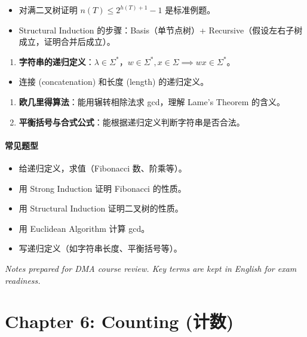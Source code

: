 \documentclass[10pt,a4paper,openany]{ctexbook}
\theoremstyle{definition}
\theoremstyle{remark}
\begin{document}
\begin{itemize}
\item 对满二叉树证明 $n(T) \le 2^{h(T)+1} - 1$ 是标准例题。
\item Structural Induction 的步骤：Basis（单节点树）+ Recursive（假设左右子树成立，证明合并后成立）。

\end{itemize}

\begin{enumerate}
\item \textbf{字符串的递归定义}：$\lambda \in \Sigma^*$，$w \in \Sigma^*, x \in \Sigma \implies wx \in \Sigma^*$。
\end{enumerate}

\begin{itemize}
\item 连接 (concatenation) 和长度 (length) 的递归定义。

\end{itemize}

\begin{enumerate}
\item \textbf{欧几里得算法}：能用辗转相除法求 gcd，理解 Lame's Theorem 的含义。

\item \textbf{平衡括号与合式公式}：能根据递归定义判断字符串是否合法。

\end{enumerate}

\subsubsection{常见题型}

\begin{itemize}
\item 给递归定义，求值（Fibonacci 数、阶乘等）。
\item 用 Strong Induction 证明 Fibonacci 的性质。
\item 用 Structural Induction 证明二叉树的性质。
\item 用 Euclidean Algorithm 计算 gcd。
\item 写递归定义（如字符串长度、平衡括号等）。

\end{itemize}

\vspace{-2pt}

\textit{Notes prepared for DMA course review. Key terms are kept in English for exam readiness.}

\chapter{Chapter 6: Counting (计数)}
\end{document}
